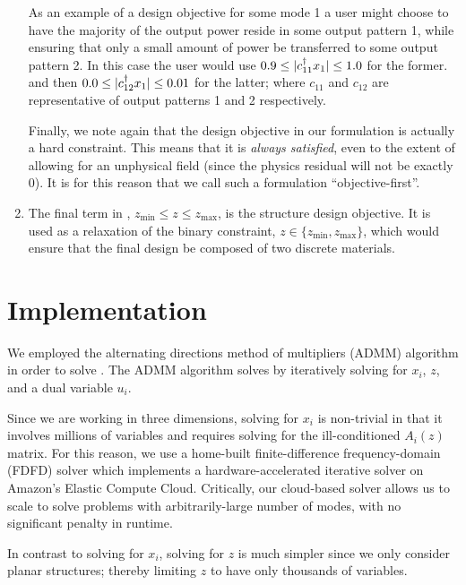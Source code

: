 \begin{enumerate}
    As an example of a design objective for some mode 1 
        a user might choose to have the majority of the output power
        reside in some output pattern 1,
        while ensuring that only a small amount of power 
        be transferred to some output pattern 2.
    In this case the user would use 
        $0.9 \le |c_{11}^\dagger x_1| \le 1.0$ for the former.
        and then $0.0 \le |c_{12}^\dagger x_1| \le 0.01$ for the latter;
        where $c_{11}$ and $c_{12}$ are representative of 
        output patterns 1 and 2 respectively.
        
    Finally, we note again that the design objective in our formulation
        is actually a hard constraint.
    This means that it is \emph{always satisfied}, 
        even to the extent of allowing for an unphysical field 
        (since the physics residual will not be exactly 0).
    It is for this reason that we call such a formulation ``objective-first''.

\item 
    The final term in , $z_\text{min} \le z \le z_\text{max}$,
        is the structure design objective.
    It is used as a relaxation of the binary constraint,
        $z \in \{z_\text{min}, z_\text{max}\}$,
        which would ensure that the final design be composed 
        of two discrete materials.
\end{enumerate}

\section{Implementation}
We employed the alternating directions method of multipliers (ADMM) algorithm 
    \cite{admm}
    in order to solve .
The ADMM algorithm solves  by iteratively solving for 
    $x_i$, $z$, and a dual variable $u_i$.

Since we are working in three dimensions, solving  for $x_i$ 
    is non-trivial in that it involves millions of variables and
    requires solving for the ill-conditioned $A_i(z)$ matrix.
For this reason, we use a home-built
    finite-difference frequency-domain (FDFD) solver which 
    implements a hardware-accelerated iterative solver\cite{wonseok}
    on Amazon's Elastic Compute Cloud.
Critically, our cloud-based solver allows us to scale to solve problems
    with arbitrarily-large number of modes,
    with no significant penalty in runtime.

In contrast to solving for $x_i$, solving for $z$ is much simpler since we
    only consider planar structures;
    thereby limiting $z$ to have only thousands of variables.

